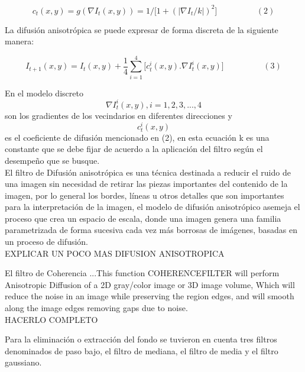 \begin{displaymath}
c_t(x,y)=g(\nabla I_t(x,y))=1/\lbrack1+(\left|\nabla I_t/k\right|)^2\rbrack \hspace{2cm}(2)
\end{displaymath}

La difusión anisotrópica  se puede expresar de forma discreta de la siguiente manera:

\begin{displaymath}
I_{t+1}(x,y)=I_t(x,y) + \frac14{{{\sum_{i=1}^{4} \lbrack c_t^i(x,y).\nabla I_t^i(x,y)\rbrack}}} \hspace{2cm}(3)
\end{displaymath}

En el modelo discreto \begin{displaymath} \nabla I_t^i(x,y), i= 1,2,3,...,4 \end{displaymath} son los gradientes de los vecindarios en diferentes direcciones y \begin{displaymath} c_t^i(x,y) \end{displaymath} es el coeficiente de difusi\'on mencionado en (2), en esta ecuaci\'on k es una constante que se debe fijar de acuerdo a la aplicaci\'on del filtro seg\'un el desempe\~no que se busque.\\

El filtro de Difusi\'on anisotr\'opica es una técnica destinada a reducir el ruido de una imagen sin necesidad de retirar las piezas importantes del contenido de la imagen, por lo general los bordes, líneas u otros detalles que son importantes para la interpretación de la imagen, el modelo de difusión anisotrópico asemeja el proceso que crea un espacio de escala, donde una imagen genera una familia parametrizada de forma sucesiva cada vez más borrosas de imágenes, basadas en un proceso de difusión.\\ 

EXPLICAR UN POCO MAS DIFUSION ANISOTROPICA

El filtro de Coherencia ...This function COHERENCEFILTER will perform Anisotropic Diffusion of a 2D gray/color image or 3D image volume, Which will reduce the noise in an image while preserving the region edges, and will smooth along
the image edges removing gaps due to noise.\\ HACERLO COMPLETO 



Para la eliminaci\'on o extracci\'on del fondo se tuvieron en cuenta tres filtros denominados de paso bajo, el filtro de mediana, el filtro de media y el filtro gaussiano. 

